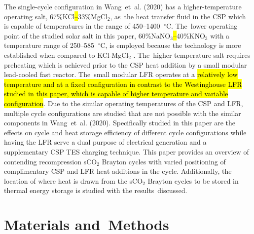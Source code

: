 \documentclass[sustainability,article,accept,moreauthors,pdftex]{Definitions/mdpi}
\begin{document}
The single-cycle configuration in Wang~et~al. (2020) has a higher-temperature operating salt, 67\%KCl\hl{--}33\%MgCl$_2$, as~the heat transfer fluid in the CSP which is capable of temperatures in the range of 450--1400 $~^{\circ}$C. The~lower operating point of the studied solar salt in this paper, 60\%NaNO$_3$\hl{--}40\%KNO$_3$ %
with a temperature range of 250--585 $~^{\circ}$C, is employed because the technology is more established when compared to KCl-MgCl$_2$ \cite{turchi_2018}. The~higher temperature salt requires preheating which is achieved prior to the CSP heat addition by a small modular lead-cooled fast reactor. The~small modular LFR operates at a \hl{relatively low temperature and at a fixed configuration in contrast to the Westinghouse LFR studied in this paper, which is capable of higher temperature and variable configuration}. Due to the similar operating temperatures of the CSP and LFR, multiple cycle configurations are studied that are not possible with the similar components in Wang~et~al. (2020). Specifically studied in this paper are the effects on cycle and heat storage efficiency of different cycle configurations while having the LFR serve a dual purpose of electrical generation and a supplementary CSP TES charging technique. This paper provides an overview of contending recompression sCO$_2$ Brayton cycles with varied positioning of complimentary CSP and LFR heat additions in the cycle. Additionally, the location of where heat is drawn from the sCO$_2$ Brayton cycles to be stored in thermal energy storage is studied with the results~discussed.



 
\section{Materials and~Methods}

\end{document}
